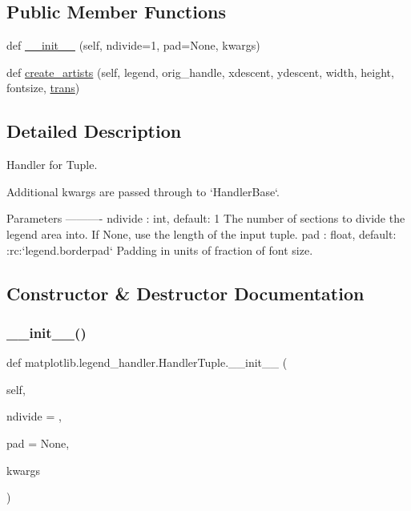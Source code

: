 \subsection*{Public Member Functions}
\begin{DoxyCompactItemize}
\item 
def \hyperlink{classmatplotlib_1_1legend__handler_1_1HandlerTuple_a7ac3b9ef40a86c2c540e21edef008ef4}{\+\_\+\+\_\+init\+\_\+\+\_\+} (self, ndivide=1, pad=None, kwargs)
\item 
def \hyperlink{classmatplotlib_1_1legend__handler_1_1HandlerTuple_a0724ba39f2f44fee049c6377a96a1d06}{create\+\_\+artists} (self, legend, orig\+\_\+handle, xdescent, ydescent, width, height, fontsize, \hyperlink{size_2foo_8f90_afabfd8da71309850231a00e53c61f106}{trans})
\end{DoxyCompactItemize}


\subsection{Detailed Description}
\begin{DoxyVerb}Handler for Tuple.

Additional kwargs are passed through to `HandlerBase`.

Parameters
----------
ndivide : int, default: 1
    The number of sections to divide the legend area into. If None,
    use the length of the input tuple.
pad : float, default: :rc:`legend.borderpad`
    Padding in units of fraction of font size.
\end{DoxyVerb}
 

\subsection{Constructor \& Destructor Documentation}
\mbox{\label{classmatplotlib_1_1legend__handler_1_1HandlerTuple_a7ac3b9ef40a86c2c540e21edef008ef4}} 
\subsubsection{\texorpdfstring{\+\_\+\+\_\+init\+\_\+\+\_\+()}{\_\_init\_\_()}}
{\footnotesize\ttfamily def matplotlib.\+legend\+\_\+handler.\+Handler\+Tuple.\+\_\+\+\_\+init\+\_\+\+\_\+ (\begin{DoxyParamCaption}\item[{}]{self,  }\item[{}]{ndivide = {},  }\item[{}]{pad = {\ttfamily None},  }\item[{}]{kwargs }\end{DoxyParamCaption})}




